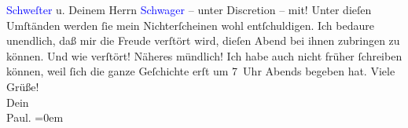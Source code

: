                   \textcolor{blue}{Schweſter}{} u. Deinem Herrn
                  \textcolor{blue}{Schwager}{} – unter
               Discretion – mit! Unter dieſen Umſtänden {\pb}werden ſie mein Nichterſcheinen
               wohl entſchuldigen. Ich bedaure unendlich, daß mir die Freude verſtört wird, dieſen
               Abend bei ihnen zubringen zu können. Und wie verſtört! Näheres mündlich!\pend
           \pstart
           Ich habe auch nicht früher ſchreiben können, weil ſich die ganze Geſchichte erſt um
                  7 Uhr Abends begeben hat.\pend
           \pstart
           Viele Grüße!{\\[\baselineskip]}Dein{\\[\baselineskip]}\spacefill\mbox{Paul.}\pend
           \leftskip=0em{}\endnumbering{}  
      
